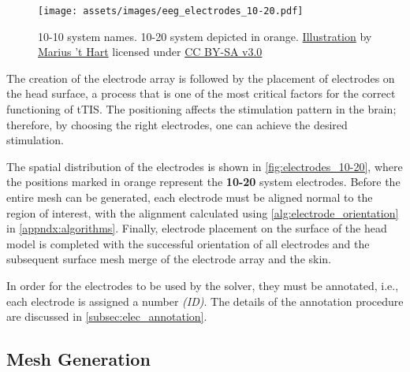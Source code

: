 \begin{wrapfigure}{l}{0.48\textwidth}
    \centering
    \vspace{-15pt}
    \texttt{[image: assets/images/eeg\_electrodes\_10-20.pdf]}
    \caption[10-10 system names. The orange electrodes are used in the 10-20 system.]{10-10 system names. 10-20 system depicted in orange. \href{http://www.mariusthart.net/downloads/eeg_electrodes_10-20.svg}{Illustration} by \href{http://www.beteredingen.nl}{Marius 't Hart} licensed under \href{http://creativecommons.org/licenses/by-sa/3.0/nl/deed.en_GB}{CC BY-SA v3.0}}
    \label{fig:electrodes_10-20}
\end{wrapfigure}

The creation of the electrode array is followed by the placement of electrodes on the head surface, a process that is one of the most critical factors for the correct functioning of \gls{tTIS}. The positioning affects the stimulation pattern in the brain; therefore, by choosing the right electrodes, one can achieve the desired stimulation.

The spatial distribution of the electrodes is shown in \autoref{fig:electrodes_10-20}, where the positions marked in orange represent the \textbf{10-20} system electrodes. Before the entire mesh can be generated, each electrode must be aligned normal to the region of interest, with the alignment calculated using \autoref{alg:electrode_orientation} in \autoref{appndx:algorithms}. Finally, electrode placement on the surface of the head model is completed with the successful orientation of all electrodes and the subsequent surface mesh merge of the electrode array and the skin.

In order for the electrodes to be used by the solver, they must be annotated, i.e., each electrode is assigned a number \textit{(ID)}. The details of the annotation procedure are discussed in \ref{subsec:elec_annotation}.

\subsection{Mesh Generation}
\label{subsec:mesh_generation}

